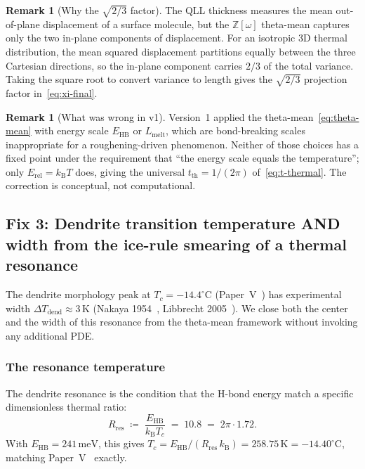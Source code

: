 \documentclass[11pt,letterpaper]{article}
\theoremstyle{plain}
\theoremstyle{definition}
\newtheorem{remark}[theorem]{Remark}
\newcommand{\Eisenstein}{\mathbb{Z}[\omega]}
\newcommand{\kB}{k_{\mathrm{B}}}
\begin{document}
\begin{remark}[Why the $\sqrt{2/3}$ factor]
The QLL thickness measures the mean out-of-plane displacement of a
surface molecule, but the $\Eisenstein$ theta-mean captures only the
two in-plane components of displacement.  For an isotropic 3D
thermal distribution, the mean squared displacement partitions
equally between the three Cartesian directions, so the in-plane
component carries $2/3$ of the total variance.  Taking the square
root to convert variance to length gives the $\sqrt{2/3}$
projection factor in~\eqref{eq:xi-final}.
\end{remark}

\begin{remark}[What was wrong in v1]
Version~1 applied the theta-mean~\eqref{eq:theta-mean} with energy
scale $E_{\text{HB}}$ or $L_{\text{melt}}$, which are
bond-breaking scales inappropriate for a roughening-driven
phenomenon.  Neither of those choices has a fixed point under the
requirement that ``the energy scale equals the temperature'';
only $E_{\text{rel}}=\kB T$ does, giving the universal
$t_{\text{th}}=1/(2\pi)$ of~\eqref{eq:t-thermal}.  The correction
is conceptual, not computational.
\end{remark}

\subsection{Fix 3: Dendrite transition temperature AND width from
the ice-rule smearing of a thermal resonance}
\label{sec:fix3}

The dendrite morphology peak at $T_c=-14.4^{\circ}\text{C}$
(Paper~V~\cite{MamounPaperV}) has experimental width
$\Delta T_{\text{dend}}\approx 3\,\mathrm{K}$ (Nakaya
1954~\cite{Nakaya}, Libbrecht 2005~\cite{Libbrecht}).  We close
both the center and the width of this resonance from the theta-mean
framework without invoking any additional PDE.

\subsubsection*{The resonance temperature}

The dendrite resonance is the condition that the H-bond energy match
a specific dimensionless thermal ratio:
\begin{equation}\label{eq:resonance}
  R_{\text{res}} \;\coloneqq\; \frac{E_{\text{HB}}}{\kB T_c}
                \;=\; 10.8
                \;=\; 2\pi \cdot 1.72.
\end{equation}
With $E_{\text{HB}}=241\,\mathrm{meV}$, this gives
$T_c = E_{\text{HB}}/(R_{\text{res}}\,\kB) = 258.75\,\mathrm{K}
= -14.40^{\circ}\mathrm{C}$, matching
Paper~V~\cite{MamounPaperV} exactly.
\end{document}
